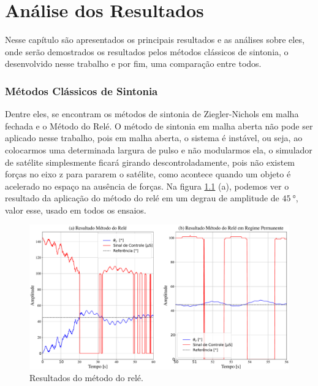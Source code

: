\chapter{Análise dos Resultados}

Nesse capítulo são apresentados os principais resultados e as análises sobre eles, onde serão demostrados os resultados pelos métodos clássicos de sintonia, o desenvolvido nesse trabalho e por fim, uma comparação entre todos.


\subsection{Métodos Clássicos de Sintonia}

Dentre eles, se encontram os métodos de sintonia de Ziegler-Nichols em malha fechada e o Método do Relé. O método de sintonia em malha aberta não pode ser aplicado nesse trabalho, pois em malha aberta, o sistema é instável, ou seja, ao colocarmos uma determinada largura de pulso e não modularmos ela, o simulador de satélite simplesmente ficará girando descontroladamente, pois não existem forças no eixo z para pararem o satélite, como acontece quando um objeto é acelerado no espaço na ausência de forças. Na figura \ref{fig:relay} (a), podemos ver o resultado da aplicação do método do relé em um degrau de amplitude de $\SI{45}{\degree}$, valor esse, usado em todos os ensaios.

\begin{figure}[H]
  \caption{Resultados do método do relé.}
  \begin{center}
      \includegraphics[scale=0.35]{resultados/img/relay}
  \end{center}
  \label{fig:relay}
\end{figure}
 
